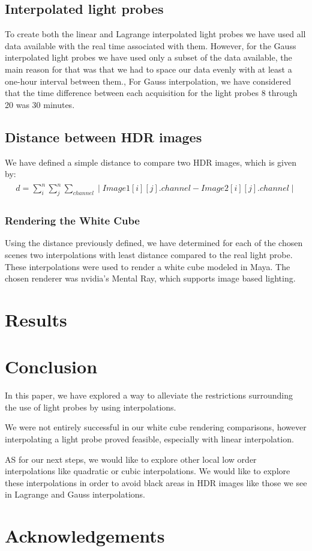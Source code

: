 \documentclass[conference]{acmsiggraph}
\begin{document}
\subsection{Interpolated light probes}
	To create both the linear and Lagrange interpolated light probes we have used all data available with the real time associated with them. 
However, for the Gauss interpolated light probes we have used only a subset of the data available, the main reason for that was that we had to space our data evenly with at least a one-hour interval between them., For Gauss interpolation, we have considered that the time difference between each acquisition for the light probes 8 through 20 was 30 minutes.

\subsection{Distance between HDR images}
	We have defined a simple distance to compare two HDR images, which is given by:
\begin{align}
\begin{split}
	d = \sum\limits_{i}^{n} \sum\limits_{j}^{n} \sum\limits_{channel} \mid Image1[i][j].channel - Image2[i][j].channel \mid
\end{split}
\end{align}

\subsubsection{Rendering the White Cube}
	Using the distance previously defined, we have determined for each of the chosen scenes two interpolations with least distance compared to the real light probe. These interpolations were used to render a white cube modeled in Maya. The chosen renderer was nvidia’s Mental Ray, which supports image based lighting.

\section{Results}

\section{Conclusion}

In this paper, we have explored a way to alleviate the restrictions surrounding the use of light probes by using interpolations. 

We were not entirely successful in our white cube rendering comparisons, however interpolating a light probe proved feasible, especially with linear interpolation.

AS for our next steps, we would like to explore other local low order interpolations like quadratic or cubic interpolations. We would like to explore these interpolations in order to avoid black areas in HDR images like those we see in Lagrange and Gauss interpolations.


\section*{Acknowledgements}



\end{document}
